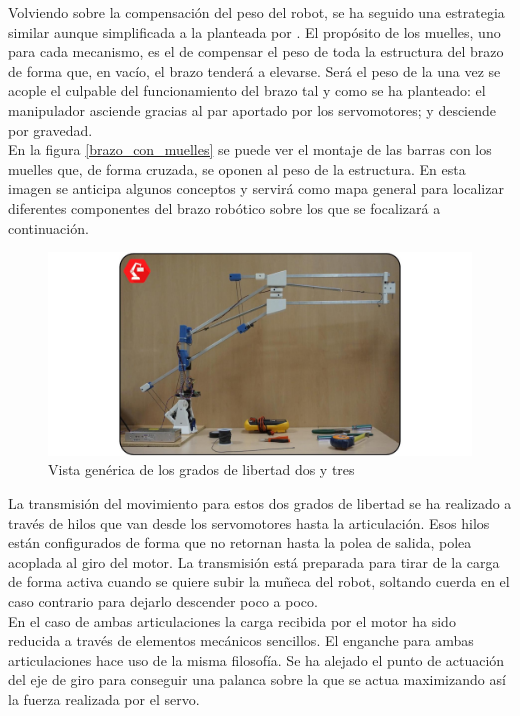     Volviendo sobre la compensación del peso del robot, se ha seguido una estrategia similar aunque simplificada a la planteada por \cite{Rahman_asimple}. El propósito de los muelles, uno para cada mecanismo, es el de compensar el peso de toda la estructura del brazo de forma que, en vacío, el brazo tenderá a elevarse. Será el peso de la  una vez se acople el culpable del funcionamiento del brazo tal y como se ha planteado: el manipulador asciende gracias al par aportado por los servomotores; y desciende por gravedad.
    \\

    En la figura \ref{brazo_con_muelles} se puede ver el montaje de las barras con los muelles que, de forma cruzada, se oponen al peso de la estructura. En esta imagen se anticipa algunos conceptos y servirá como mapa general para localizar diferentes componentes del brazo robótico sobre los que se focalizará a continuación.

    \begin{figure}[H]
        \centering
        \includegraphics[width=\textwidth]{figuras/Imagenes_Mecanica/foto_brazo_10.jpg}
        \caption{Vista genérica de los grados de libertad dos y tres}
        \label{fig:Mecanica:brazo_con_muelles}
    \end{figure}


    La transmisión del movimiento para estos dos grados de libertad se ha realizado a través de hilos que van desde los servomotores hasta la articulación. Esos hilos están configurados de forma que no retornan hasta la polea de salida, polea acoplada al giro del motor. La transmisión está preparada para tirar de la carga de forma activa cuando se quiere subir la muñeca del robot, soltando cuerda en el caso contrario para dejarlo descender poco a poco.
	\\ 
	
    En el caso de ambas articulaciones la carga recibida por el motor ha sido reducida a través de elementos mecánicos sencillos. El enganche para ambas articulaciones hace uso de la misma filosofía. Se ha alejado el punto de actuación del eje de giro para conseguir una palanca sobre la que se actua maximizando así la fuerza realizada por el servo.
    \\

